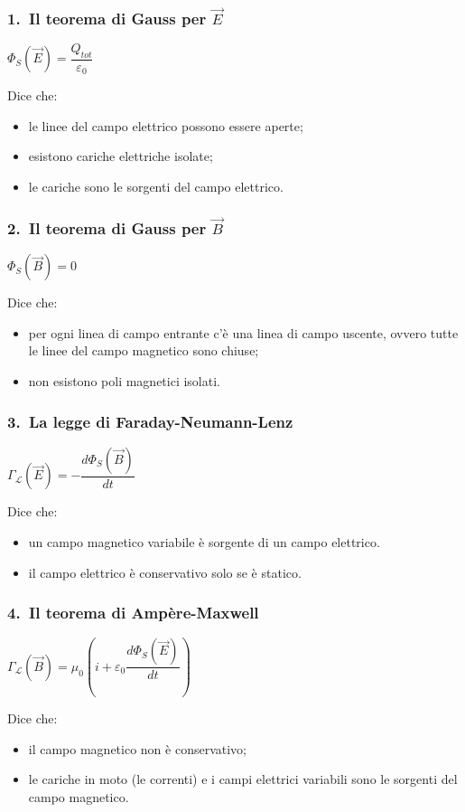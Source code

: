 \documentclass[]{beamer}
\theoremstyle{plain}
\begin{document}
\begin{frame}
  \frametitle{1.~Il teorema di Gauss per $ \vec{E} $}
    \begin{center}
  \colorbox{blue!30}{$ \Phi_S (\vec{E}) = \dfrac{Q_{tot}}{\varepsilon_0} $}
  \end{center}\pause
  Dice che:
  \begin{itemize}
    \item le linee del campo elettrico possono essere aperte;\pause
    \item esistono cariche elettriche isolate;\pause
    \item le cariche sono le sorgenti del campo elettrico.
  \end{itemize}
\end{frame}

\begin{frame}
  \frametitle{2.~Il teorema di Gauss per $ \vec{B} $}
    \begin{center}
  \colorbox{blue!30}{$ \Phi_S (\vec{B}) = 0 $}
  \end{center}\pause
  Dice che:
  \begin{itemize}
    \item per ogni linea di campo entrante c'è una linea di campo uscente, ovvero tutte le linee del campo magnetico sono chiuse;\pause
    \item non esistono poli magnetici isolati.
  \end{itemize}
\end{frame}

\begin{frame}
  \frametitle{3.~La legge di Faraday-Neumann-Lenz}
  \begin{center}
\colorbox{blue!30}{  $ \Gamma_\mathscr{L} (\vec{E}) = -\dfrac{d\Phi_S(\vec{B})}{dt} $}
  \end{center}\pause
  Dice che:
  \begin{itemize}
    \item un campo magnetico variabile è sorgente di un campo elettrico.\pause
    \item il campo elettrico è conservativo solo se è statico.
  \end{itemize}
\end{frame}

\begin{frame}
  \frametitle{4.~Il teorema di Ampère-Maxwell}
  \begin{center}
\colorbox{blue!30}{$ \Gamma_\mathscr{L} (\vec{B}) = \mu_0 \left( i + \varepsilon_0 \dfrac{d\Phi_S(\vec{E})}{dt} \right) $}
  \end{center}\pause
  Dice che:
  \begin{itemize}
    \item il campo magnetico non è conservativo;\pause
    \item le cariche in moto (le correnti) e i campi elettrici variabili sono le sorgenti del campo magnetico.
  \end{itemize}
\end{frame}
\end{document}
